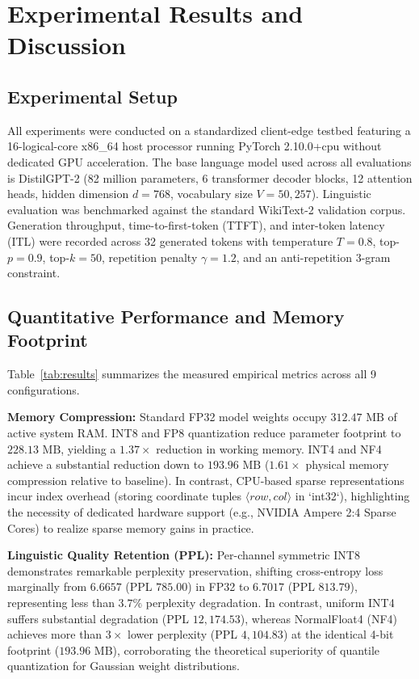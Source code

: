\documentclass[conference]{IEEEtran}
\begin{document}
\section{Experimental Results and Discussion}
\label{sec:results}

\subsection{Experimental Setup}
All experiments were conducted on a standardized client-edge testbed featuring a 16-logical-core x86\_64 host processor running PyTorch 2.10.0+cpu without dedicated GPU acceleration. The base language model used across all evaluations is DistilGPT-2 (82 million parameters, 6 transformer decoder blocks, 12 attention heads, hidden dimension $d=768$, vocabulary size $V=50,257$). Linguistic evaluation was benchmarked against the standard WikiText-2 validation corpus. Generation throughput, time-to-first-token (TTFT), and inter-token latency (ITL) were recorded across 32 generated tokens with temperature $T=0.8$, top-$p=0.9$, top-$k=50$, repetition penalty $\gamma=1.2$, and an anti-repetition 3-gram constraint.

\subsection{Quantitative Performance and Memory Footprint}
Table~\ref{tab:results} summarizes the measured empirical metrics across all 9 configurations.

\textbf{Memory Compression:} Standard FP32 model weights occupy $312.47\text{ MB}$ of active system RAM. INT8 and FP8 quantization reduce parameter footprint to $228.13\text{ MB}$, yielding a $1.37\times$ reduction in working memory. INT4 and NF4 achieve a substantial reduction down to $193.96\text{ MB}$ ($1.61\times$ physical memory compression relative to baseline). In contrast, CPU-based sparse representations incur index overhead (storing coordinate tuples $\langle row, col \rangle$ in `int32`), highlighting the necessity of dedicated hardware support (e.g., NVIDIA Ampere 2:4 Sparse Cores) to realize sparse memory gains in practice.

\textbf{Linguistic Quality Retention (PPL):}
Per-channel symmetric INT8 demonstrates remarkable perplexity preservation, shifting cross-entropy loss marginally from $6.6657$ (PPL $785.00$) in FP32 to $6.7017$ (PPL $813.79$), representing less than $3.7\%$ perplexity degradation. In contrast, uniform INT4 suffers substantial degradation (PPL $12,174.53$), whereas NormalFloat4 (NF4) achieves more than $3\times$ lower perplexity (PPL $4,104.83$) at the identical 4-bit footprint ($193.96\text{ MB}$), corroborating the theoretical superiority of quantile quantization for Gaussian weight distributions.
\end{document}
